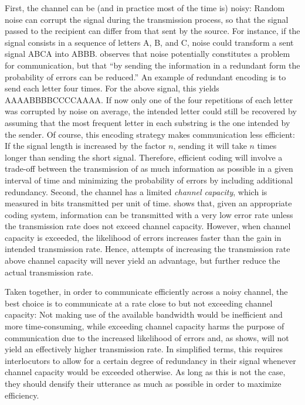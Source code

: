 First, the channel can be (and in practice most of the time is) noisy: Random noise can corrupt the signal during the transmission process, so that the signal passed to the recipient can differ from that sent by the source. For instance, if the signal consists in a sequence of letters A, B, and C, noise could transform a sent signal ABCA into ABBB. \citet[410]{shannon1948} observes that noise potentially constitutes a problem for communication, but that ``by sending the information in a redundant form the probability of errors can be reduced.'' An example of redundant encoding is to send each letter four times. For the above signal, this yields AAAABBBBCCCCAAAA. If now only one of the four repetitions of each letter was corrupted by noise on average, the intended letter could still be recovered by assuming that the most frequent letter in each substring is the one intended by the sender. Of course, this encoding strategy makes communication less efficient: If the signal length is increased by the factor $n$, sending it will take $n$ times longer than sending the short signal. Therefore, efficient coding will involve a trade-off between the transmission of as much information as possible in a given interval of time and minimizing the probability of errors by including additional redundancy. Second, the channel has a limited \textit{channel capacity}, which is measured in bits transmitted per unit of time. \citet[401--413]{shannon1948} shows that, given an appropriate coding system, information can be transmitted with a very low error rate unless the transmission rate does not exceed channel capacity. However, when channel capacity is exceeded, the likelihood of errors increases faster than the gain in intended transmission rate. Hence, attempts of increasing the transmission rate above channel capacity will never yield an advantage, but further reduce the actual transmission rate.

Taken together, in order to communicate efficiently across a noisy channel, the best choice is to communicate at a rate close to but not exceeding channel capacity: Not making use of the available bandwidth would be inefficient and more time-consuming, while exceeding channel capacity harms the purpose of communication due to the increased likelihood of errors and, as \citeauthor{shannon1948} shows, will not yield an effectively higher transmission rate. In simplified terms, this requires interlocutors to allow for a certain degree of redundancy in their signal whenever channel capacity would be exceeded otherwise. As long as this is not the case, they should densify their utterance as much as possible in order to maximize efficiency.

